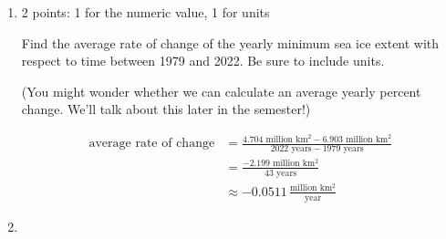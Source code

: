 \documentclass{article}
\begin{document}
\begin{enumerate}
\begin{enumerate}
    \begin{problem}[\vfill\newpage]
      In \ref{sea-ice-change} and \ref{sea-ice-percent-change}, you used two different measures to describe how the yearly minimum sea ice extent changed between 1979 and 2022. Which measure do you find more informative, and why?
    \end{problem}

    \begin{solution}
      This is a matter of personal opinion! Personally, I find the percent change more informative. Since I don't have any idea how much sea ice is in the Arctic, just seeing how many km$^2$ the amount changed by doesn't give me any context for whether that's a significant change or not; the percent change gives me a much better idea. 
    \end{solution}

  \item \label{sea-ice-average-rate-of-change}

    \begin{grading}
      2 points: 1 for the numeric value, 1 for units
    \end{grading}

    \begin{problem}[\vfill]
      Find the average rate of change of the yearly minimum sea ice extent with respect to time between 1979 and 2022. Be sure to include units.
    \end{problem}

    \begin{problemonly}
      (You might wonder whether we can calculate an average yearly percent change. We'll talk about this later in the semester!)
    \end{problemonly}

    \begin{solution}
      \begin{align*}
          \text{average rate of change} &= \frac{4.704 \text{ million km$^2$} - 
            6.903 \text{ million km$^2$}}{2022 \text{ years} - 1979 \text{ years}} \\
            &= \frac{-2.199 \text{ million km$^2$}}{43 \text{ years}} \\
            &\approx -0.0511\, \frac{\text{million km$^2$}}{\text{year}}
      \end{align*}
    \end{solution}

  \item \label{sea-ice-average-rate-of-change-misleading}


\end{enumerate}
\end{enumerate}
\end{document}
